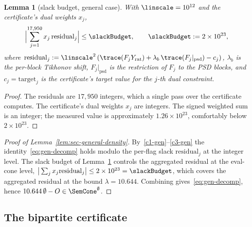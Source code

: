 \documentclass[11pt,a4paper]{article}
\newtheorem{lemma}[theorem]{Lemma}
\theoremstyle{definition}
\theoremstyle{remark}
\begin{document}
\begin{lemma}[slack budget, general case]
\label{lem:slack-gen}
With $\linscale = 10^{12}$ and the certificate's dual weights $x_j$,
\[
\Bigl|\sum_{j = 1}^{17{,}950} x_j\,\mathrm{residual}_j\Bigr|
\leq \slackBudget,
\qquad
\slackBudget := 2 \times 10^{23},
\]
where $\mathrm{residual}_j := \linscale^2\,
(\trace(F_j Y_{\mathrm{rat}}) + \lambda_b\,\trace(F_j|_{\mathrm{psd}})
- c_j)$, $\lambda_b$ is the per-block Tikhonov shift, $F_j|_{\mathrm{psd}}$
is the restriction of $F_j$ to the PSD blocks, and
$c_j = \mathrm{target}_j$ is the certificate's target value for the
$j$-th dual constraint.
\end{lemma}

\begin{proof}
The residuals are $17{,}950$ integers, which a single pass over the
certificate computes. The certificate's dual weights $x_j$ are integers. The signed
weighted sum is an integer; the measured value is approximately
$1.26 \times 10^{23}$, comfortably below $2 \times 10^{23}$.
\end{proof}

\begin{proof}[Proof of Lemma~\ref{lem:sec-general-density}]
By~\ref{c1-gen}--\ref{c3-gen} the
identity~\eqref{eq:gen-decomp} holds modulo the per-flag slack
$\mathrm{residual}_j$ at the integer level. The slack budget of
Lemma~\ref{lem:slack-gen} controls the aggregated residual at
the eval-cone level, $\big|\sum_j x_j \mathrm{residual}_j\big| \leq
2 \times 10^{23} = \slackBudget$, which covers the aggregated
residual at the bound $\lambda = 10.644$. Combining
gives~\eqref{eq:gen-decomp}, hence
$10.644\,\emptyset - O \in \SemCone^\emptyset$.
\end{proof}

\subsection{The bipartite certificate}
\label{sec:cert-bipartite}
\end{document}
